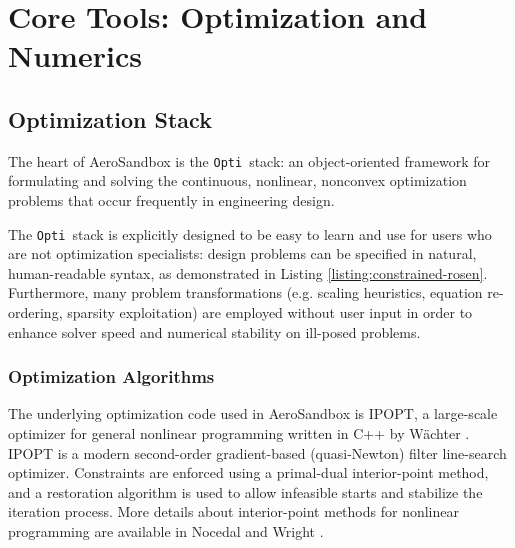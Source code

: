 \chapter{Core Tools: Optimization and Numerics}
\label{chapter:core}


\section{Optimization Stack}

\newcommand{\opti}{\texttt{Opti}}

The heart of AeroSandbox is the \opti\ stack: an object-oriented framework for formulating and solving the continuous, nonlinear, nonconvex optimization problems that occur frequently in engineering design.

The \opti\ stack is explicitly designed to be easy to learn and use for users who are not optimization specialists: design problems can be specified in natural, human-readable syntax, as demonstrated in Listing \ref{listing:constrained-rosen}. Furthermore, many problem transformations (e.g. scaling heuristics, equation re-ordering, sparsity exploitation) are employed without user input in order to enhance solver speed and numerical stability on ill-posed problems.



\subsection{Optimization Algorithms}
\label{sect:ipopt}

The underlying optimization code used in AeroSandbox is IPOPT, a large-scale optimizer for general nonlinear programming written in C++ by Wächter \cite{ipopt}. IPOPT is a modern second-order gradient-based (quasi-Newton) filter line-search optimizer. Constraints are enforced using a primal-dual interior-point method, and a restoration algorithm is used to allow infeasible starts and stabilize the iteration process. More details about interior-point methods for nonlinear programming are available in Nocedal and Wright \cite{nocedal2006}.


